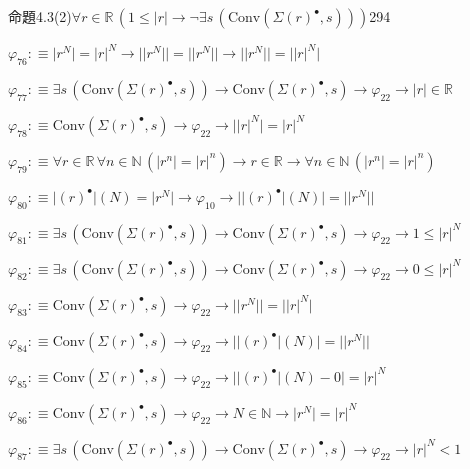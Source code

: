 \begin{fullproof}{命題4.3(2)}{$\forall r \in \mathbb{R}\,(1 \leq \lvert r \rvert \to \neg \exists s\,(\mathrm{Conv}(\Sigma {(r)^{\bullet}},s)))$}{294}
\begin{abbrevlist}
\item $\varphi_{76} :\equiv \lvert {{r}^{N}} \rvert = {{\lvert r \rvert}^{N}} \to \lvert \lvert {{r}^{N}} \rvert \rvert = \lvert \lvert {{r}^{N}} \rvert \rvert \to \lvert \lvert {{r}^{N}} \rvert \rvert = \lvert {{\lvert r \rvert}^{N}} \rvert$
\item $\varphi_{77} :\equiv \exists s\,(\mathrm{Conv}(\Sigma {(r)^{\bullet}},s)) \to \mathrm{Conv}(\Sigma {(r)^{\bullet}},s) \to \varphi_{22} \to \lvert r \rvert \in \mathbb{R}$
\item $\varphi_{78} :\equiv \mathrm{Conv}(\Sigma {(r)^{\bullet}},s) \to \varphi_{22} \to \lvert {{\lvert r \rvert}^{N}} \rvert = {{\lvert r \rvert}^{N}}$
\item $\varphi_{79} :\equiv \forall r \in \mathbb{R}\,\forall n \in \mathbb{N}\,(\lvert {{r}^{n}} \rvert = {{\lvert r \rvert}^{n}}) \to r \in \mathbb{R} \to \forall n \in \mathbb{N}\,(\lvert {{r}^{n}} \rvert = {{\lvert r \rvert}^{n}})$
\item $\varphi_{80} :\equiv \lvert {(r)^{\bullet}} \rvert(N) = \lvert {{r}^{N}} \rvert \to \varphi_{10} \to \lvert \lvert {(r)^{\bullet}} \rvert(N) \rvert = \lvert \lvert {{r}^{N}} \rvert \rvert$
\item $\varphi_{81} :\equiv \exists s\,(\mathrm{Conv}(\Sigma {(r)^{\bullet}},s)) \to \mathrm{Conv}(\Sigma {(r)^{\bullet}},s) \to \varphi_{22} \to 1 \leq {{\lvert r \rvert}^{N}}$
\item $\varphi_{82} :\equiv \exists s\,(\mathrm{Conv}(\Sigma {(r)^{\bullet}},s)) \to \mathrm{Conv}(\Sigma {(r)^{\bullet}},s) \to \varphi_{22} \to 0 \leq {{\lvert r \rvert}^{N}}$
\item $\varphi_{83} :\equiv \mathrm{Conv}(\Sigma {(r)^{\bullet}},s) \to \varphi_{22} \to \lvert \lvert {{r}^{N}} \rvert \rvert = \lvert {{\lvert r \rvert}^{N}} \rvert$
\item $\varphi_{84} :\equiv \mathrm{Conv}(\Sigma {(r)^{\bullet}},s) \to \varphi_{22} \to \lvert \lvert {(r)^{\bullet}} \rvert(N) \rvert = \lvert \lvert {{r}^{N}} \rvert \rvert$
\item $\varphi_{85} :\equiv \mathrm{Conv}(\Sigma {(r)^{\bullet}},s) \to \varphi_{22} \to \lvert \lvert {(r)^{\bullet}} \rvert(N) - 0 \rvert = {{\lvert r \rvert}^{N}}$
\item $\varphi_{86} :\equiv \mathrm{Conv}(\Sigma {(r)^{\bullet}},s) \to \varphi_{22} \to N \in \mathbb{N} \to \lvert {{r}^{N}} \rvert = {{\lvert r \rvert}^{N}}$
\item $\varphi_{87} :\equiv \exists s\,(\mathrm{Conv}(\Sigma {(r)^{\bullet}},s)) \to \mathrm{Conv}(\Sigma {(r)^{\bullet}},s) \to \varphi_{22} \to {{\lvert r \rvert}^{N}} < 1$

\end{abbrevlist}
\end{fullproof}
